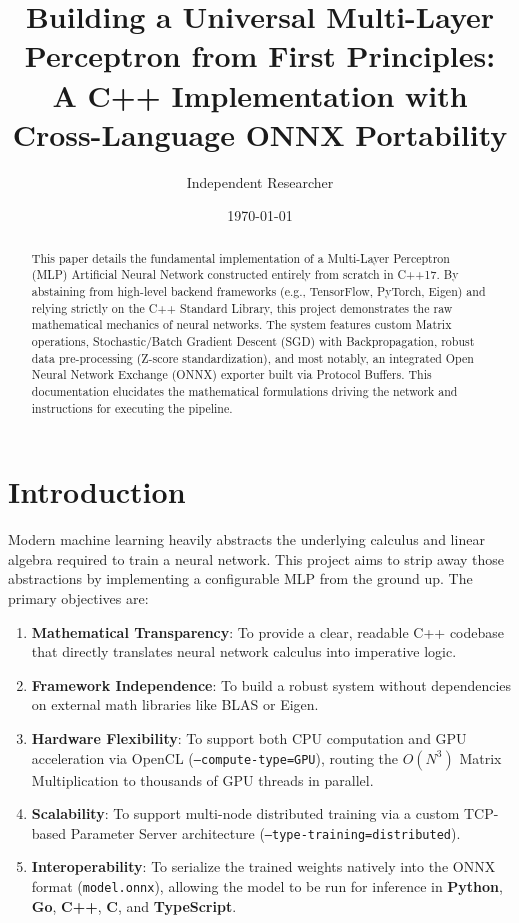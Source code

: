 \documentclass[11pt, a4paper]{article}
\title{Building a Universal Multi-Layer Perceptron from First Principles: A C++ Implementation with Cross-Language ONNX Portability}
\author{Independent Researcher}
\date{\today}
\begin{document}
\maketitle

\begin{abstract}
This paper details the fundamental implementation of a Multi-Layer Perceptron (MLP) Artificial Neural Network constructed entirely from scratch in C++17. By abstaining from high-level backend frameworks (e.g., TensorFlow, PyTorch, Eigen) and relying strictly on the C++ Standard Library, this project demonstrates the raw mathematical mechanics of neural networks. The system features custom Matrix operations, Stochastic/Batch Gradient Descent (SGD) with Backpropagation, robust data pre-processing (Z-score standardization), and most notably, an integrated Open Neural Network Exchange (ONNX) exporter built via Protocol Buffers. This documentation elucidates the mathematical formulations driving the network and instructions for executing the pipeline.
\end{abstract}

\section{Introduction}
Modern machine learning heavily abstracts the underlying calculus and linear algebra required to train a neural network. This project aims to strip away those abstractions by implementing a configurable MLP from the ground up. The primary objectives are:
\begin{enumerate}
    \item \textbf{Mathematical Transparency}: To provide a clear, readable C++ codebase that directly translates neural network calculus into imperative logic.
    \item \textbf{Framework Independence}: To build a robust system without dependencies on external math libraries like BLAS or Eigen.
    \item \textbf{Hardware Flexibility}: To support both CPU computation and GPU acceleration via OpenCL (\texttt{--compute-type=GPU}), routing the $O(N^3)$ Matrix Multiplication to thousands of GPU threads in parallel.
    \item \textbf{Scalability}: To support multi-node distributed training via a custom TCP-based Parameter Server architecture (\texttt{--type-training=distributed}).
    \item \textbf{Interoperability}: To serialize the trained weights natively into the ONNX format (\texttt{model.onnx}), allowing the model to be run for inference in \textbf{Python}, \textbf{Go}, \textbf{C++}, \textbf{C}, and \textbf{TypeScript}.
\end{enumerate}
\end{document}
